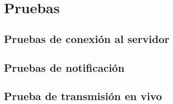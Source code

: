 \chapter{Pruebas}

\section{Pruebas de conexión al servidor}

\section{Pruebas de notificación}

\section{Prueba de transmisión en vivo}

